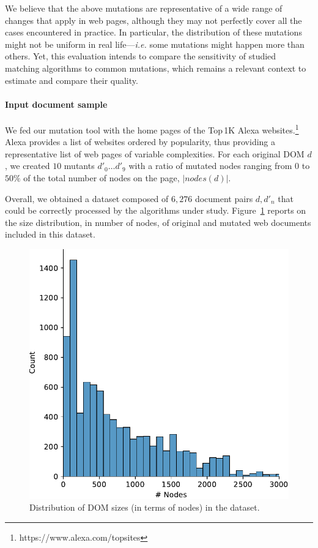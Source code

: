We believe that the above mutations are representative of a wide range of changes that apply in web pages, although they may not perfectly cover all the cases encountered in practice.
In particular, the distribution of these mutations might not be uniform in real life---\emph{i.e.} some mutations might happen more than others.
Yet, this evaluation intends to compare the sensitivity of studied matching algorithms to common mutations, which remains a relevant context to estimate and compare their quality.

\paragraph{Input document sample}
We fed our mutation tool with the home pages of the Top\,1K Alexa websites.\footnote{https://www.alexa.com/topsites}
Alexa provides a list of websites ordered by popularity, thus providing a representative list of web pages of variable complexities.
For each original DOM $d$, we created $10$ mutants $d'_0\dots d'_9$ with a ratio of mutated nodes ranging from $0$ to $50\%$ of the total number of nodes on the page, $|nodes(d)|$.

Overall, we obtained a dataset composed of $6,276$ document pairs $d,d'_n$ that could be correctly processed by the algorithms under study.
Figure~\ref{fig:distribution} reports on the size distribution, in number of nodes, of original and mutated web documents included in this dataset.

\begin{figure}
    \centering
    \includegraphics[width=.6\linewidth]{tree-matching/graphs/distribution_size}
    \caption{Distribution of DOM sizes (in terms of nodes) in the dataset.}
    \label{fig:distribution}
\end{figure}

